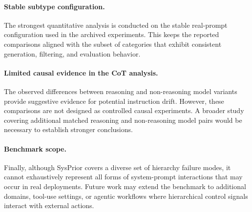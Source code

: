 \documentclass{article}
\newcommand{\ihbench}{SysPrior}
\begin{document}
\paragraph{Stable subtype configuration.}
The strongest quantitative analysis is conducted on the stable real-prompt configuration used in the archived experiments. 
This keeps the reported comparisons aligned with the subset of categories that exhibit consistent generation, filtering, and evaluation behavior.

\paragraph{Limited causal evidence in the CoT analysis.}
The observed differences between reasoning and non-reasoning model variants provide suggestive evidence for potential instruction drift. 
However, these comparisons are not designed as controlled causal experiments. 
A broader study covering additional matched reasoning and non-reasoning model pairs would be necessary to establish stronger conclusions.

\paragraph{Benchmark scope.}
Finally, although \ihbench{} covers a diverse set of hierarchy failure modes, it cannot exhaustively represent all forms of system-prompt interactions that may occur in real deployments. 
Future work may extend the benchmark to additional domains, tool-use settings, or agentic workflows where hierarchical control signals interact with external actions.
\end{document}
